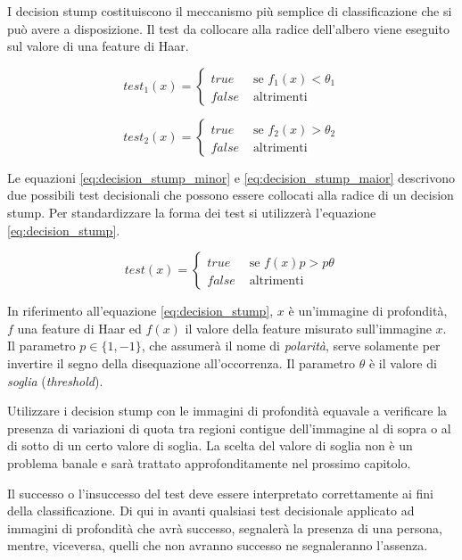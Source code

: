 I decision stump costituiscono il meccanismo più semplice di classificazione che si può avere a disposizione. Il test da collocare alla radice dell'albero viene eseguito sul valore di una feature di Haar.

\begin{equation}
    test_1(x) =
    \begin{cases}
        true & \text{ se } f_1(x) < \theta_1\\
        false & \text{ altrimenti }
    \end{cases}
    \label{eq:decision_stump_minor}
\end{equation}

\begin{equation}
    test_2(x) =
    \begin{cases}
        true & \text{ se } f_2(x) > \theta_2\\
        false & \text{ altrimenti }
    \end{cases}
    \label{eq:decision_stump_maior}
\end{equation}

Le equazioni \ref{eq:decision_stump_minor} e \ref{eq:decision_stump_maior} descrivono due possibili test decisionali che possono essere collocati alla radice di un decision stump.
Per standardizzare la forma dei test si utilizzerà l'equazione \ref{eq:decision_stump}.

\begin{equation}
    test(x) =
    \begin{cases}
        true & \text{ se } f(x)p > p\theta\\
        false & \text{ altrimenti }
    \end{cases}
    \label{eq:decision_stump}
\end{equation}

In riferimento all'equazione \ref{eq:decision_stump}, $x$ è un'immagine di profondità, $f$ una feature di Haar ed $f(x)$ il valore della feature misurato sull'immagine $x$.
Il parametro $p \in \{ 1, -1 \}$, che assumerà il nome di \emph{polarità}, serve solamente per invertire il segno della disequazione all'occorrenza.
Il parametro $\theta$ è il valore di \emph{soglia} (\emph{threshold}).

Utilizzare i decision stump con le immagini di profondità equavale a verificare la presenza di variazioni di quota tra regioni contigue dell'immagine al di sopra o al di sotto di un certo valore di soglia.
La scelta del valore di soglia non è un problema banale e sarà trattato approfonditamente nel prossimo capitolo.

Il successo o l'insuccesso del test deve essere interpretato correttamente ai fini della classificazione. Di qui in avanti qualsiasi test decisionale applicato ad immagini di profondità che avrà successo, segnalerà la presenza di una persona, mentre, viceversa, quelli che non avranno successo ne segnaleranno l'assenza.
